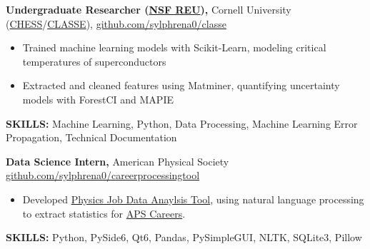 \documentclass[11pt]{article}       %
\begin{document}
\textbf{Undergraduate Researcher (\href{https://new.nsf.gov/funding/initiatives/reu}{NSF REU}),} {Cornell University (\href{https://www.chess.cornell.edu}{CHESS}/\href{https://www.classe.cornell.edu/StudentOpportunities/ProjectList2022.html}{CLASSE}),} \hfill \href{https://github.com/sylphrena0/classe}{github.com/sylphrena0/classe}
\vspace{-9pt}
\begin{itemize}[leftmargin=0.35in]
  \item Trained machine learning models with Scikit-Learn, modeling critical temperatures of superconductors
  \item Extracted and cleaned features using Matminer, quantifying uncertainty models with ForestCI and MAPIE
\end{itemize}
\vspace{-9pt}
\textbf{SKILLS:} Machine Learning, Python, Data Processing, Machine Learning Error Propagation, Technical Documentation
\vspace{9pt}

\textbf{Data Science Intern,} {American Physical Society} \hfill \href{https://github.com/sylphrena0/careerprocessingtool}{github.com/sylphrena0/careerprocessingtool} \\
\vspace{-9pt}
\begin{itemize}[leftmargin=0.35in]
  \item  Developed \href{https://github.com/sylphrena0/careerprocessingtool}{Physics Job Data Anaylsis Tool}, using natural language processing to extract statistics for \href{https://www.aps.org/careers}{APS Careers}.
\end{itemize}
\vspace{-9pt}
\textbf{SKILLS:} Python, PySide6, Qt6, Pandas, PySimpleGUI, NLTK, SQLite3, Pillow

\vspace{9pt}
\end{document}
